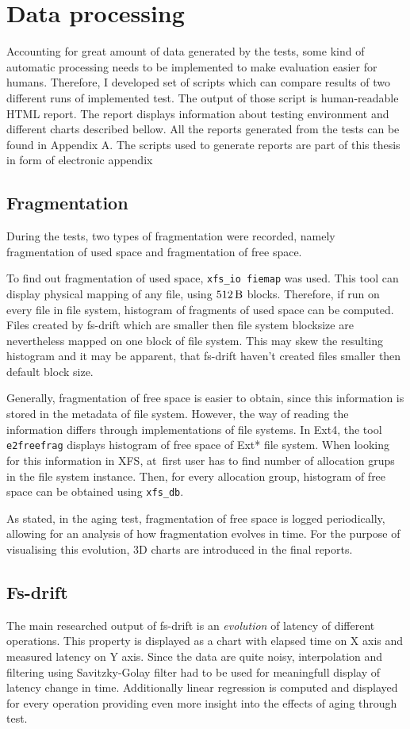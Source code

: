 \documentclass[
  color, %
  table, %
  lof,   %
  lot,   %
]{fithesis3}
\begin{document}
\section{Data processing}
Accounting for great amount of data generated by the tests, some kind of automatic processing needs to be implemented to make evaluation easier for humans. Therefore, I developed set of scripts which can compare results of two different runs of implemented test. The output of those script is human-readable HTML report. The report displays information about testing environment and different charts described bellow. All the reports generated from the tests can be found in Appendix A. The scripts used to generate reports are part of this thesis in form of electronic appendix

\subsection{Fragmentation}
During the tests, two types of fragmentation were recorded, namely fragmentation of used space and fragmentation of free space.

To find out fragmentation of used space, \texttt{xfs\_io fiemap} was used. This tool can display physical mapping of any file, using $\SI{512}{\byte}$ blocks. Therefore, if run on every file in file system, histogram of fragments of used space can be computed. Files created by fs-drift which are smaller then file system blocksize are nevertheless mapped on one block of file system. This may skew the resulting histogram and it may be apparent, that fs-drift haven't created files smaller then default block size.

Generally, fragmentation of free space is easier to obtain, since this information is stored in the metadata of file system. However, the way of reading the information differs through implementations of file systems. In Ext4, the tool \texttt{e2freefrag} displays histogram of free space of Ext* file system. When looking for this information in XFS, at~first user has to find number of allocation grups in the file system instance. Then, for every allocation group, histogram of free space can be obtained using \texttt{xfs\_db}.

As stated, in the aging test, fragmentation of free space is logged periodically, allowing for an analysis of how fragmentation evolves in time. For the purpose of visualising this evolution, 3D charts are introduced in the final reports.

\subsection{Fs-drift}
The main researched output of fs-drift is an \emph{evolution} of latency of different operations. This property is displayed as a chart with elapsed time on X axis and measured latency on Y axis. Since the data are quite noisy, interpolation and filtering using Savitzky-Golay filter had to be used for meaningfull display of latency change in time. Additionally linear regression is computed and displayed for every operation providing even more insight into the effects of aging through test.
\end{document}
